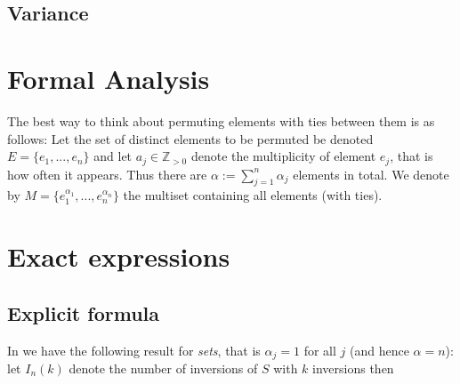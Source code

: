 \documentclass{article}
\newcommand{\zz}{\mathbb{Z}}
\begin{document}
\subsection{Variance}

\section{Formal Analysis}

The best way to think about permuting elements with ties between them is as follows: Let the set of distinct elements to be permuted be denoted $E=\{e_1,...,e_n\}$ and let $a_j\in \zz_{>0}$ denote the multiplicity of element $e_j$, that is how often it appears. Thus there are $\alpha:=\sum_{j=1}^n \alpha_j$ elements in total. We denote by $M=\{e_{1}^{\alpha_{1}},...,e_{n}^{\alpha_n}\}$ the multiset containing all elements (with ties).

\section{Exact expressions}

\subsection{Explicit formula}

In \cite{Margolius2001} we have the following result for \emph{sets}, that is $\alpha_j=1$ for all $j$ (and hence $\alpha=n$): let $I_n(k)$ denote the number of inversions of $S$ with $k$ inversions then
\end{document}
